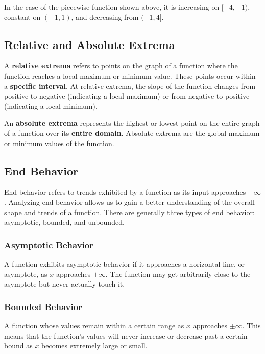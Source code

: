 \documentclass{article}
\begin{document}
In the case of the piecewise function shown above, it is increasing on $[-4, -1)$, constant on $(-1, 1)$, and decreasing from $(-1, 4]$.

\subsection{Relative and Absolute Extrema}

A \textbf{relative extrema} refers to points on the graph of a function where the function reaches a local maximum or minimum value. These points occur within a \textbf{specific interval}. At relative extrema, the slope of the function changes from positive to negative (indicating a local maximum) or from negative to positive (indicating a local minimum).

An \textbf{absolute extrema} represents the highest or lowest point on the entire graph of a function over its \textbf{entire domain}. Absolute extrema are the global maximum or minimum values of the function. 

\subsection{End Behavior}
End behavior refers to trends exhibited by a function as its input approaches $\pm\infty$. Analyzing end behavior allows us to gain a better understanding of the overall shape and trends of a function. There are generally three types of end behavior: asymptotic, bounded, and unbounded.

\subsubsection*{Asymptotic Behavior}
A function exhibits asymptotic behavior if it approaches a horizontal line, or asymptote, as $x$ approaches $\pm\infty$. The function may get arbitrarily close to the asymptote but never actually touch it.

\begin{center}
\end{center}

\subsubsection*{Bounded Behavior}
A function whose values remain within a certain range as $x$ approaches $\pm\infty$. This means that the function's values will never increase or decrease past a certain bound as $x$ becomes extremely large or small.
\end{document}

